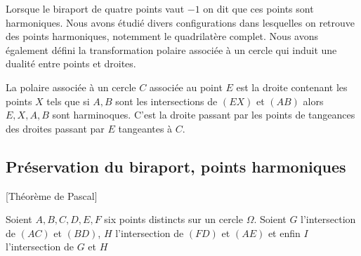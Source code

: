 Lorsque le biraport de quatre points vaut $-1$ on dit que ces points sont harmoniques. Nous avons étudié divers configurations dans lesquelles on retrouve des points harmoniques, notemment le quadrilatère complet. Nous avons également défini la transformation polaire associée à un cercle qui induit une dualité entre points et droites.

\begin{defn}
La polaire associée à un cercle $C$ associée au point $E$ est la droite contenant les points $X$ tels que si $A,B$ sont les intersections de $(EX)$ et $(AB)$ alors $E,X,A,B$ sont harminoques. C'est la droite passant par les points de tangeances des droites passant par $E$ tangeantes à $C$.

\end{defn}

\subsection*{Préservation du biraport, points harmoniques}

\begin{thm}{[Théorème de Pascal]}

Soient $A,B,C,D,E,F$ six points distincts sur un cercle $\Omega$. Soient $G$ l'intersection de $(AC)$ et $(BD)$, $H$ l'intersection de $(FD)$ et $(AE)$ et enfin $I$ l'intersection de $G$ et $H$  

\end{thm}

